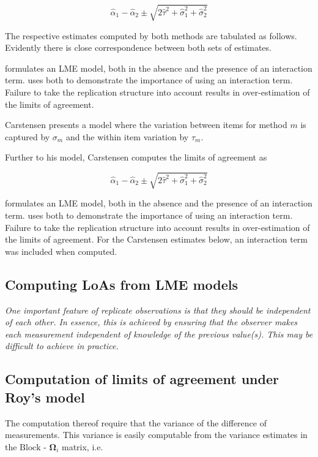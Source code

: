 \documentclass[12pt, a4paper]{report}
\theoremstyle{plain}
\theoremstyle{definition}
\theoremstyle{remark}
\begin{document}
	\[
	\hat{\alpha}_1 - \hat{\alpha}_2 \pm \sqrt{2 \hat{\tau}^2 +
		\hat{\sigma}^2_1 + \hat{\sigma}^2_2}
	\]
	
	The respective estimates computed by both methods are tabulated as follows. Evidently there is close correspondence between both sets of estimates.
	
	\citet{BXC2008} formulates an LME model, both in the absence and the presence of an interaction term.\citet{bxc} uses both to demonstrate the importance of using an interaction term. Failure to take the replication structure into
	account results in over-estimation of the limits of agreement. 
	
	
	Carstensen presents a model where the variation between items for
	method $m$ is captured by $\sigma_m$ and the within item variation
	by $\tau_m$.
	
	Further to his model, Carstensen computes the limits of agreement
	as
	
	\[
	\hat{\alpha}_1 - \hat{\alpha}_2 \pm \sqrt{2 \hat{\tau}^2 +
		\hat{\sigma}^2_1 + \hat{\sigma}^2_2}
	\]
	
	
	\citet{BXC2008} formulates an LME model, both in the absence and the presence of an interaction term.\citet{BXC2008} uses both to demonstrate the importance of using an interaction term. Failure to take the replication structure into
	account results in over-estimation of the limits of agreement. For the Carstensen estimates below, an interaction term was included when computed.
\subsection{Computing LoAs from LME models}

\emph{
	One important feature of replicate observations is that they should be independent
	of each other. In essence, this is achieved by ensuring that the observer makes each
	measurement independent of knowledge of the previous value(s). This may be difficult
	to achieve in practice.}


\subsection{Computation of limits of agreement under Roy's model}

The computation thereof require that the variance of the difference of measurements. This variance is easily computable from the  variance estimates in the ${\mbox{Block - }\boldsymbol \Omega_{i}}$ matrix, i.e.
\end{document}
